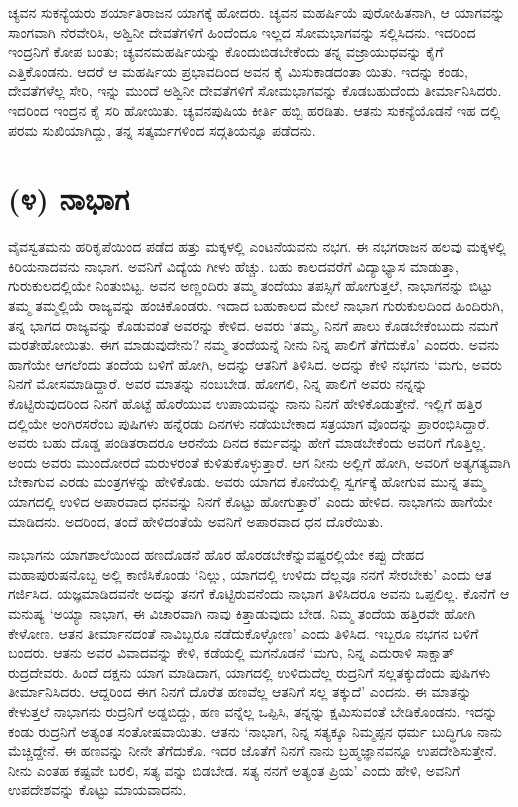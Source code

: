 ಚ್ಯವನ ಸುಕನ್ಯೆಯರು ಶರ್ಯಾತಿರಾಜನ ಯಾಗಕ್ಕೆ ಹೋದರು. ಚ್ಯವನ ಮಹರ್ಷಿಯೆ ಪುರೋಹಿತನಾಗಿ, ಆ ಯಾಗವನ್ನು ಸಾಂಗವಾಗಿ ನೆರವೇರಿಸಿ, ಅಶ್ವಿನೀ ದೇವತೆಗಳಿಗೆ ಹಿಂದೆಂದೂ ಇಲ್ಲದ ಸೋಮಭಾಗವನ್ನು ಸಲ್ಲಿಸಿದನು. ಇದರಿಂದ ಇಂದ್ರನಿಗೆ ಕೋಪ ಬಂತು; ಚ್ಯವನಮಹರ್ಷಿಯನ್ನು ಕೊಂದುಬಿಡಬೇಕೆಂದು ತನ್ನ ವಜ್ರಾಯುಧವನ್ನು ಕೈಗೆ ಎತ್ತಿಕೊಂಡನು. ಆದರೆ ಆ ಮಹರ್ಷಿಯ ಪ್ರಭಾವದಿಂದ ಅವನ ಕೈ ಮಿಸುಕಾಡದಂತಾ ಯಿತು. ಇದನ್ನು ಕಂಡು, ದೇವತೆಗಳೆಲ್ಲ ಸೇರಿ, ಇನ್ನು ಮುಂದೆ ಅಶ್ವಿನೀ ದೇವತೆಗಳಿಗೆ ಸೋಮಭಾಗವನ್ನು ಕೊಡಬಹುದೆಂದು ತೀರ್ಮಾನಿಸಿದರು. ಇದರಿಂದ ಇಂದ್ರನ ಕೈ ಸರಿ ಹೋಯಿತು. ಚ್ಯವನಪುಷಿಯ ಕೀರ್ತಿ ಹಬ್ಬಿ ಹರಡಿತು. ಆತನು ಸುಕನ್ಯೆಯೊಡನೆ ಇಹ ದಲ್ಲಿ ಪರಮ ಸುಖಿಯಾಗಿದ್ದು, ತನ್ನ ಸತ್ಕರ್ಮಗಳಿಂದ ಸದ್ಗತಿಯನ್ನೂ ಪಡೆದನು.


\section{(೪) ನಾಭಾಗ}

ವೈವಸ್ವತಮನು ಹರಿಕೃಪೆಯಿಂದ ಪಡೆದ ಹತ್ತು ಮಕ್ಕಳಲ್ಲಿ ಎಂಟನೆಯವನು ನಭಗ. ಈ ನಭಗರಾಜನ ಹಲವು ಮಕ್ಕಳಲ್ಲಿ ಕಿರಿಯನಾದವನು ನಾಭಾಗ. ಅವನಿಗೆ ವಿದ್ಯೆಯ ಗೀಳು ಹೆಚ್ಚು. ಬಹು ಕಾಲದವರೆಗೆ ವಿದ್ಯಾಭ್ಯಾಸ ಮಾಡುತ್ತಾ, ಗುರುಕುಲದಲ್ಲಿಯೇ ನಿಂತುಬಿಟ್ಟ. ಅವನ ಅಣ್ಣಂದಿರು ತಮ್ಮ ತಂದೆಯು ತಪಸ್ಸಿಗೆ ಹೋಗುತ್ತಲೆ, ನಾಭಾಗನನ್ನು ಬಿಟ್ಟು ತಮ್ಮ ತಮ್ಮಲ್ಲಿಯೆ ರಾಜ್ಯವನ್ನು ಹಂಚಿಕೊಂಡರು. ಇದಾದ ಬಹುಕಾಲದ ಮೇಲೆ ನಾಭಾಗ ಗುರುಕುಲದಿಂದ ಹಿಂದಿರುಗಿ, ತನ್ನ ಭಾಗದ ರಾಜ್ಯವನ್ನು ಕೊಡುವಂತೆ ಅವರನ್ನು ಕೇಳಿದ. ಅವರು ‘ತಮ್ಮ, ನಿನಗೆ ಪಾಲು ಕೊಡಬೇಕೆಂಬುದು ನಮಗೆ ಮರತೇಹೋಯಿತು. ಈಗ ಮಾಡುವುದೇನು? ನಮ್ಮ ತಂದೆಯನ್ನೆ ನೀನು ನಿನ್ನ ಪಾಲಿಗೆ ತೆಗೆದುಕೊ’ ಎಂದರು. ಅವನು ಹಾಗೆಯೇ ಆಗಲೆಂದು ತಂದೆಯ ಬಳಿಗೆ ಹೋಗಿ, ಅದನ್ನು ಆತನಿಗೆ ತಿಳಿಸಿದ. ಅದನ್ನು ಕೇಳಿ ನಭಗನು ‘ಮಗು, ಅವರು ನಿನಗೆ ಮೋಸಮಾಡಿದ್ದಾರೆ. ಅವರ ಮಾತನ್ನು ನಂಬಬೇಡ. ಹೋಗಲಿ, ನಿನ್ನ ಪಾಲಿಗೆ ಅವರು ನನ್ನನ್ನು ಕೊಟ್ಟಿರುವುದರಿಂದ ನಿನಗೆ ಹೊಟ್ಟೆ ಹೊರೆಯುವ ಉಪಾಯವನ್ನು ನಾನು ನಿನಗೆ ಹೇಳಿಕೊಡುತ್ತೇನೆ. ಇಲ್ಲಿಗೆ ಹತ್ತಿರ ದಲ್ಲಿಯೇ ಅಂಗಿರಸರೆಂಬ ಪುಷಿಗಳು ಹನ್ನೆರಡು ದಿನಗಳು ನಡೆಯಬೇಕಾದ ಸತ್ರಯಾಗ ವೊಂದನ್ನು ಪ್ರಾರಂಭಿಸಿದ್ದಾರೆ. ಅವರು ಬಹು ದೊಡ್ಡ ಪಂಡಿತರಾದರೂ ಆರನೆಯ ದಿನದ ಕರ್ಮವನ್ನು ಹೇಗೆ ಮಾಡಬೇಕೆಂದು ಅವರಿಗೆ ಗೊತ್ತಿಲ್ಲ. ಅಂದು ಅವರು ಮುಂದೋರದೆ ಮರುಳರಂತೆ ಕುಳಿತುಕೊಳ್ಳುತ್ತಾರೆ. ಆಗ ನೀನು ಅಲ್ಲಿಗೆ ಹೋಗಿ, ಅವರಿಗೆ ಅತ್ಯಗತ್ಯವಾಗಿ ಬೇಕಾಗುವ ಎರಡು ಮಂತ್ರಗಳನ್ನು ಹೇಳಿಕೊಡು. ಅವರು ಯಾಗದ ಕೊನೆಯಲ್ಲಿ ಸ್ವರ್ಗಕ್ಕೆ ಹೋಗುವ ಮುನ್ನ ತಮ್ಮ ಯಾಗದಲ್ಲಿ ಉಳಿದ ಅಪಾರವಾದ ಧನವನ್ನು ನಿನಗೆ ಕೊಟ್ಟು ಹೋಗುತ್ತಾರೆ’ ಎಂದು ಹೇಳಿದ. ನಾಭಾಗನು ಹಾಗೆಯೇ ಮಾಡಿದನು. ಅದರಿಂದ, ತಂದೆ ಹೇಳಿದಂತೆಯೆ ಅವನಿಗೆ ಅಪಾರವಾದ ಧನ ದೊರೆಯಿತು.

ನಾಭಾಗನು ಯಾಗಶಾಲೆಯಿಂದ ಹಣದೊಡನೆ ಹೊರ ಹೊರಡಬೇಕೆನ್ನುವಷ್ಟರಲ್ಲಿಯೇ ಕಪ್ಪು ದೇಹದ ಮಹಾಪುರುಷನೊಬ್ಬ ಅಲ್ಲಿ ಕಾಣಿಸಿಕೊಂಡು ‘ನಿಲ್ಲು, ಯಾಗದಲ್ಲಿ ಉಳಿದು ದೆಲ್ಲವೂ ನನಗೆ ಸೇರಬೇಕು’ ಎಂದು ಆತ ಗರ್ಜಿಸಿದ. ಯಜ್ಞಮಾಡಿದವನೇ ಅದನ್ನು ತನಗೆ ಕೊಟ್ಟಿರುವನೆಂದು ನಾಭಾಗ ತಿಳಿಸಿದರೂ ಅವನು ಒಪ್ಪಲಿಲ್ಲ. ಕೊನೆಗೆ ಆ ಮನುಷ್ಯ ‘ಅಯ್ಯಾ ನಾಭಾಗ, ಈ ವಿಚಾರವಾಗಿ ನಾವು ಕಿತ್ತಾಡುವುದು ಬೇಡ. ನಿಮ್ಮ ತಂದೆಯ ಹತ್ತಿರವೇ ಹೋಗಿ ಕೇಳೋಣ. ಆತನ ತೀರ್ಮಾನದಂತೆ ನಾವಿಬ್ಬರೂ ನಡೆದುಕೊಳ್ಳೋಣ’ ಎಂದು ತಿಳಿಸಿದ. ಇಬ್ಬರೂ ನಭಗನ ಬಳಿಗೆ ಬಂದರು. ಆತನು ಅವರ ವಿವಾದವನ್ನು ಕೇಳಿ, ಕಡೆಯಲ್ಲಿ ಮಗನೊಡನೆ ‘ಮಗು, ನಿನ್ನ ಎದುರಾಳಿ ಸಾಕ್ಷಾತ್ ರುದ್ರದೇವರು. ಹಿಂದೆ ದಕ್ಷನು ಯಾಗ ಮಾಡಿದಾಗ, ಯಾಗದಲ್ಲಿ ಉಳಿದುದೆಲ್ಲ ರುದ್ರನಿಗೆ ಸಲ್ಲತಕ್ಕುದೆಂದು ಪುಷಿಗಳು ತೀರ್ಮಾನಿಸಿದರು. ಆದ್ದರಿಂದ ಈಗ ನಿನಗೆ ದೊರೆತ ಹಣವೆಲ್ಲ ಆತನಿಗೆ ಸಲ್ಲ ತಕ್ಕುದೆ’ ಎಂದನು. ಈ ಮಾತನ್ನು ಕೇಳುತ್ತಲೆ ನಾಭಾಗನು ರುದ್ರನಿಗೆ ಅಡ್ಡಬಿದ್ದು, ಹಣ ವನ್ನೆಲ್ಲ ಒಪ್ಪಿಸಿ, ತನ್ನನ್ನು ಕ್ಷಮಿಸುವಂತೆ ಬೇಡಿಕೊಂಡನು. ಇದನ್ನು ಕಂಡು ರುದ್ರನಿಗೆ ಅತ್ಯಂತ ಸಂತೋಷವಾಯಿತು. ಆತನು ‘ನಾಭಾಗ, ನಿನ್ನ ಸತ್ಯಕ್ಕೂ ನಿಮ್ಮಪ್ಪನ ಧರ್ಮ ಬುದ್ಧಿಗೂ ನಾನು ಮೆಚ್ಚಿದ್ದೇನೆ. ಈ ಹಣವನ್ನು ನೀನೇ ತೆಗೆದುಕೊ. ಇದರ ಜೊತೆಗೆ ನಿನಗೆ ನಾನು ಬ್ರಹ್ಮಜ್ಞಾನವನ್ನೂ ಉಪದೇಶಿಸುತ್ತೇನೆ. ನೀನು ಎಂತಹ ಕಷ್ಟವೇ ಬರಲಿ, ಸತ್ಯ ವನ್ನು ಬಿಡಬೇಡ. ಸತ್ಯ ನನಗೆ ಅತ್ಯಂತ ಪ್ರಿಯ’ ಎಂದು ಹೇಳಿ, ಅವನಿಗೆ ಉಪದೇಶವನ್ನು ಕೊಟ್ಟು ಮಾಯವಾದನು.


